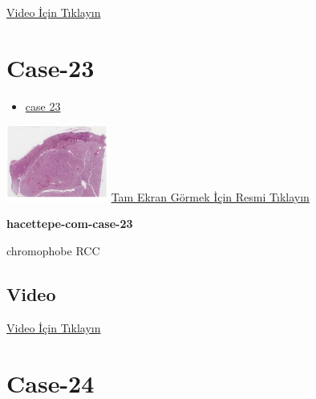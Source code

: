 \documentclass[
  letterpaper,
  DIV=11,
  numbers=noendperiod]{scrreprt}
\providecommand{\tightlist}{%
  \setlength{\itemsep}{0pt}\setlength{\parskip}{0pt}}\usepackage{longtable,booktabs,array}
\begin{document}
\href{https://www.youtube.com/watch?v=wo6N0q5EiWc}{Video İçin Tıklayın}

\hypertarget{sec-hacettepe-case-of-the-month-case-23}{%
\section{Case-23}\label{sec-hacettepe-case-of-the-month-case-23}}

\begin{itemize}
\tightlist
\item
  \href{https://www.youtube.com/watch?v=2j0ER0ShVR0\&ab_channel=KemalKosemehmetoglu}{case
  23}
\end{itemize}

\href{https://images.patolojiatlasi.com/hacettepe-com-case-23/HE.html}{\includegraphics[width=0.25\textwidth,height=\textheight]{./screenshots/thumbnail_hacettepe-com-case-23.png}}
\href{https://images.patolojiatlasi.com/hacettepe-com-case-23/HE.html}{Tam
Ekran Görmek İçin Resmi Tıklayın}

\textbf{hacettepe-com-case-23}

\begin{tcolorbox}[enhanced jigsaw, colbacktitle=quarto-callout-tip-color!10!white, colback=white, titlerule=0mm, opacityback=0, colframe=quarto-callout-tip-color-frame, opacitybacktitle=0.6, bottomrule=.15mm, breakable, coltitle=black, title=\textcolor{quarto-callout-tip-color}{\faLightbulb}\hspace{0.5em}{Tanı}, toprule=.15mm, toptitle=1mm, bottomtitle=1mm, arc=.35mm, rightrule=.15mm, leftrule=.75mm, left=2mm]

chromophobe RCC

\end{tcolorbox}

\hypertarget{video-21}{%
\subsection{Video}\label{video-21}}

\href{https://www.youtube.com/watch?v=2j0ER0ShVR0}{Video İçin Tıklayın}

\hypertarget{sec-hacettepe-case-of-the-month-case-24}{%
\section{Case-24}\label{sec-hacettepe-case-of-the-month-case-24}}
\end{document}
